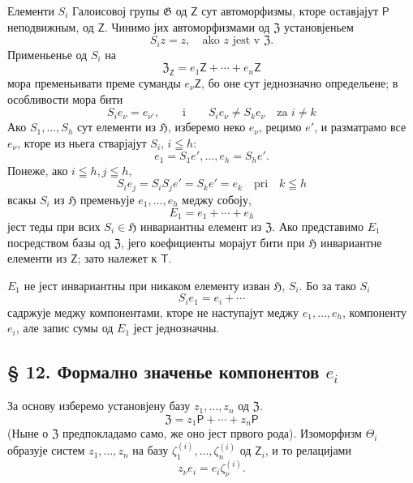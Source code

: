 \documentclass[11pt]{article}
\begin{document}
Елементи \(S_i\) Галоисовој групы \(\mathfrak G\) од \(\mathsf Z\) сут автоморфизмы, кторе оставјајут \(\mathsf P\) неподвижным, од \(\mathsf Z\). Чинимо јих автоморфизмами од \(\mathfrak Z\) установјеньем
\[
S_i z=z,\quad \text{ako } z \text{ jest v } \mathfrak Z.
\]
Применьенье од \(S_i\) на
\[
\mathfrak Z_{\mathsf Z}=e_1\mathsf Z+\cdots+e_n\mathsf Z
\]
мора пременьивати преме суманды \(e_\nu\mathsf Z\), бо оне сут једнозначно определьене; в особливости мора бити
\[
S_i e_\nu=e_{\nu'},\qquad\text{i}\qquad S_i e_\nu\ne S_k e_\nu
\quad\text{za } i\ne k
\]
Ако \(S_1,\ldots,S_h\) сут елементи из \(\mathfrak H\), изберемо неко \(e_\nu\), рецимо \(e'\), и разматрамо все \(e_\nu\), кторе из ньега стварјајут \(S_i\), \(i\leqq h\):
\[
e_1=S_1e',\ldots,e_h=S_he'.
\]
Понеже, ако \(i\leqq h, j\leqq h\),
\[
S_i e_j=S_iS_j e'=S_ke'=e_k \quad \text{pri}\quad k\leqq h
\]
всакы \(S_i\) из \(\mathfrak H\) пременьује \(e_1,\ldots,e_h\) меджу собоју,
\[
E_1=e_1+\cdots+e_h
\]
јест теды при всих \(S_i\in\mathfrak H\) инвариантны елемент из \(\mathfrak Z\). Ако представимо \(E_1\) посредством базы од \(\mathfrak Z\), јего коефициенты морајут бити при \(\mathfrak H\) инвариантне елементи из \(\mathsf Z\); зато належет к \(\mathsf T\).

\(E_1\) не јест инвариантны при никаком елементу изван \(\mathfrak H\), \(S_i\). Бо за тако \(S_i\)
\[
S_i e_1=e_i+\cdots
\]
садржује меджу компонентами, кторе не наступајут меджу \(e_1,\ldots,e_h\), компоненту \(e_i\), але запис сумы од \(E_1\) јест једнозначны.

\subsection*{§ 12. Формално значенье компонентов \(e_i\)}\label{die-formale-bedeutung-der-komponenten-ei}

За основу изберемо установјену базу \(z_1,\ldots,z_n\) од \(\mathfrak Z\).
\[
\mathfrak Z=z_1\mathsf P+\cdots+z_n\mathsf P
\]
(Ныне о \(\mathfrak Z\) предпокладамо само, же оно јест првого рода). Изоморфизм \(\Theta_i\) образује систем \(z_1,\ldots,z_n\) на базу \(\zeta_1^{(i)},\ldots,\zeta_n^{(i)}\) од \(\mathsf Z_i\), и то релацијами
\[
z_\nu e_i=e_i\zeta_\nu^{(i)} .
\]
\end{document}
